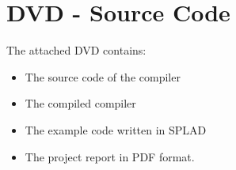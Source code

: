 \chapter{DVD - Source Code}
\label{chap:appDVD}
The attached DVD contains:
	\begin{itemize}
		\item The source code of the compiler
		\item The compiled compiler
		\item The example code written in SPLAD
		\item The project report in PDF format.
	\end{itemize}